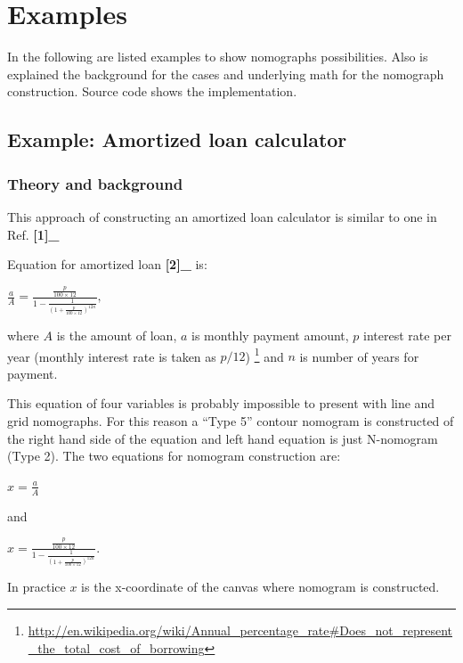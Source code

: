 \documentclass[a4paper,11pt,english]{sphinxmanual}
\begin{document}
\chapter{Examples}
\label{examples/examples::doc}\label{examples/examples:examples}
In the following are listed examples to show  nomographs possibilities.  Also is explained the background for the cases
and underlying math for the nomograph construction. Source code shows the implementation.


\section{Example: Amortized loan calculator}
\label{examples/examples:example-amortized-loan-calculator}

\subsection{Theory and background}
\label{examples/examples:theory-and-background}
This approach of constructing an amortized loan calculator is similar to
one in Ref.  {\color{red}\bfseries{}{[}1{]}\_}

Equation for amortized loan  {\color{red}\bfseries{}{[}2{]}\_} is:

\(\frac{a}{A} = \frac{\frac{p}{100\times 12}}{1-\frac{1}{(1+\frac{p}{100\times 12})^{12n}}},\)

where \(A\) is the amount of loan, \(a\) is monthly payment
amount, \(p\) interest rate per year (monthly interest rate is taken
as \(p/12\)) \footnote{
\href{http://en.wikipedia.org/wiki/Annual\_percentage\_rate\#Does\_not\_represent\_the\_total\_cost\_of\_borrowing}{http://en.wikipedia.org/wiki/Annual\_percentage\_rate\#Does\_not\_represent\_the\_total\_cost\_of\_borrowing}
} and \(n\) is number of years for payment.

This equation of four variables is probably impossible to present with
line and grid nomographs. For this reason a ``Type 5'' contour nomogram is
constructed of the right hand side of the equation and left hand
equation is just N-nomogram (Type 2). The two equations for nomogram
construction are:

\(x = \frac{a}{A}\)

and

\(x = \frac{\frac{p}{100\times 12}}{1-\frac{1}{(1+\frac{p}{100\times 12})^{12n}}}.\)

In practice \(x\) is the x-coordinate of the canvas where nomogram
is constructed.
\end{document}
